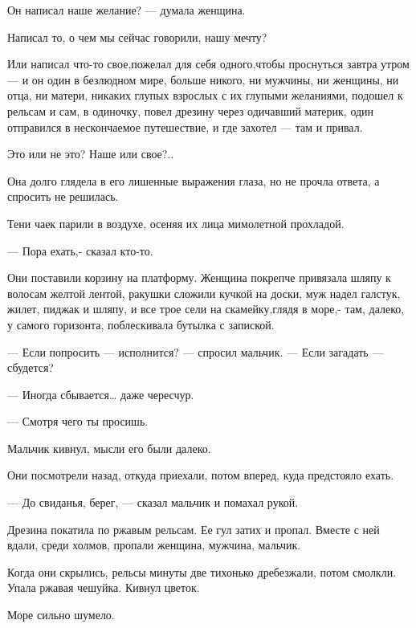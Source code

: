 Он написал наше желание? — думала женщина.

Написал то, о чем мы сейчас говорили, нашу мечту?

Или написал что-то свое,пожелал для себя одного,чтобы проснуться завтра утром —
и он один в безлюдном мире, больше никого, ни мужчины, ни женщины, ни отца, ни
матери, никаких глупых взрослых с их глупыми желаниями, подошел к рельсам и
сам, в одиночку, повел дрезину через одичавший материк, один отправился в
нескончаемое путешествие, и где захотел — там и привал.

Это или не это? Наше или свое?..

Она долго глядела в его лишенные выражения глаза, но не прочла ответа, а
спросить не решилась.

Тени чаек парили в воздухе, осеняя их лица мимолетной прохладой.

— Пора ехать,- сказал кто-то.

Они поставили корзину на платформу. Женщина покрепче привязала шляпу к волосам
желтой лентой, ракушки сложили кучкой на доски, муж надел галстук, жилет,
пиджак и шляпу, и все трое сели на скамейку,глядя в море,- там, далеко, у
самого горизонта, поблескивала бутылка с запиской.

— Если попросить — исполнится? — спросил мальчик. — Если загадать — сбудется?

— Иногда сбывается… даже чересчур.

— Смотря чего ты просишь.

Мальчик кивнул, мысли его были далеко.

Они посмотрели назад, откуда приехали, потом вперед, куда предстояло ехать.

— До свиданья, берег, — сказал мальчик и помахал рукой.

Дрезина покатила по ржавым рельсам. Ее гул затих и пропал. Вместе с ней вдали,
среди холмов, пропали женщина, мужчина, мальчик.

Когда они скрылись, рельсы минуты две тихонько дребезжали, потом смолкли. Упала
ржавая чешуйка. Кивнул цветок.

Море сильно шумело.
